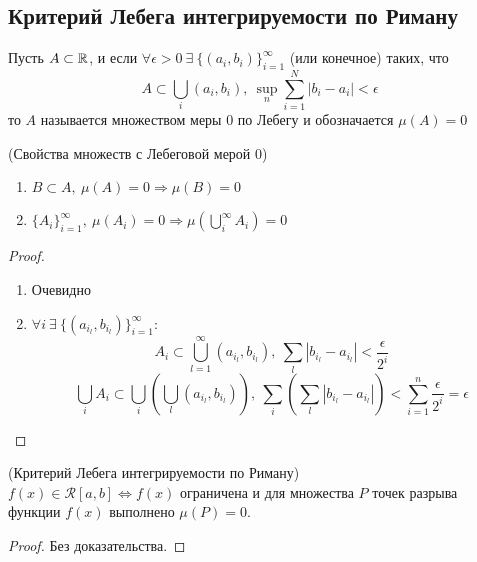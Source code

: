 \subsection{Критерий Лебега интегрируемости по Риману}
\begin{definition}
    Пусть $A\subset \mathbb{R}$, и если $\forall \epsilon>0\ \exists\ \{(a_i,b_i)\}_{i=1}^{\infty}$ (или конечное) таких, что 
    \[A\subset \bigcup\limits_i(a_i,b_i),\ \sup\limits_n \sum\limits_{i=1}^{N}|b_i-a_i|< \epsilon\]
     то $A$ называется множеством меры 0 по Лебегу и обозначается $\mu(A)=0$ 
\end{definition} 
\begin{theorem} (Свойства множеств с Лебеговой мерой 0)
    \begin{enumerate}
        \item $B\subset A,\ \mu(A)=0 \Rightarrow \mu(B)=0$
        \item $\{A_i\}_{i=1}^{\infty},\ \mu(A_i)=0 \Rightarrow \mu(\bigcup\limits_i^{\infty} A_i)=0$
    \end{enumerate}
\end{theorem} 
\begin{proof} \
    \begin{enumerate}
        \item Очевидно
        \item $\forall i\ \exists\ \{(a_{i_l},b_{i_l})\}_{i=1}^{\infty}:$
        \[A_i\subset \bigcup\limits_{l=1}^{\infty} (a_{i_l},b_{i_l}),\ \sum\limits_{l} |b_{i_l}-a_{i_l}|<\frac{\epsilon}{2^i}\]
        \[\bigcup\limits_i A_i \subset \bigcup\limits_i\left(\bigcup\limits_l (a_{i_l},b_{i_l})\right),\ \sum\limits_{i}\left(\sum\limits_{l} |b_{i_l}-a_{i_l}|\right)<\sum\limits_{i=1}^{n}\frac{\epsilon}{2^i}=\epsilon\]
    \end{enumerate}
\end{proof} 
\begin{theorem} (Критерий Лебега интегрируемости по Риману)\\
    $f(x)\in \mathcal{R}[a,b] \Leftrightarrow f(x)$ ограничена и для множества $P$ точек разрыва функции $f(x)$ выполнено $\mu(P)=0$.
\end{theorem} 
\begin{proof}
    Без доказательства.
\end{proof} 
